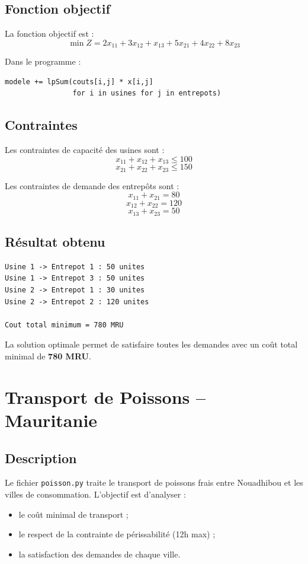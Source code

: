 \documentclass[12pt,a4paper]{article}
\begin{document}
\subsection{Fonction objectif}

La fonction objectif est :
\[
\min Z = 2x_{11} + 3x_{12} + x_{13} + 5x_{21} + 4x_{22} + 8x_{23}
\]

Dans le programme :
\begin{lstlisting}
modele += lpSum(couts[i,j] * x[i,j]
                for i in usines for j in entrepots)
\end{lstlisting}

\subsection{Contraintes}

Les contraintes de capacité des usines sont :
\[
x_{11} + x_{12} + x_{13} \leq 100
\]
\[
x_{21} + x_{22} + x_{23} \leq 150
\]

Les contraintes de demande des entrepôts sont :
\[
x_{11} + x_{21} = 80
\]
\[
x_{12} + x_{22} = 120
\]
\[
x_{13} + x_{23} = 50
\]

\subsection{Résultat obtenu}

\begin{lstlisting}
Usine 1 -> Entrepot 1 : 50 unites
Usine 1 -> Entrepot 3 : 50 unites
Usine 2 -> Entrepot 1 : 30 unites
Usine 2 -> Entrepot 2 : 120 unites

Cout total minimum = 780 MRU
\end{lstlisting}

La solution optimale permet de satisfaire toutes les demandes
avec un coût total minimal de \textbf{780 MRU}.

\section{Transport de Poissons -- Mauritanie}

\subsection{Description}
Le fichier \texttt{poisson.py} traite le transport de poissons
frais entre Nouadhibou et les villes de consommation.
L'objectif est d'analyser :
\begin{itemize}
  \item le coût minimal de transport ;
  \item le respect de la contrainte de périssabilité (12h max) ;
  \item la satisfaction des demandes de chaque ville.
\end{itemize}
\end{document}
